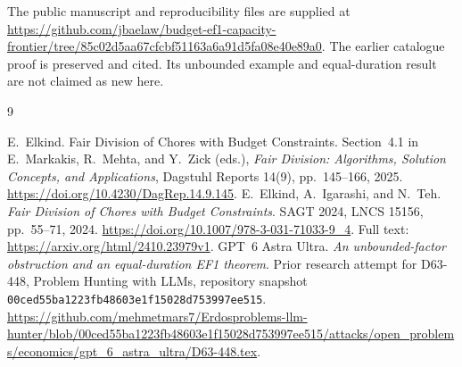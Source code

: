\documentclass[11pt]{article}
\begin{document}
The public manuscript and reproducibility files are supplied at
\url{https://github.com/jbaelaw/budget-ef1-capacity-frontier/tree/85c02d5aa67cfcbf51163a6a91d5fa08e40e89a0}.
The earlier catalogue proof is preserved and cited. Its unbounded example
and equal-duration result are not claimed as new here.

\begin{thebibliography}{9}
\raggedright
{}
E.~Elkind. Fair Division of Chores with Budget Constraints.
Section~4.1 in E.~Markakis, R.~Mehta, and Y.~Zick (eds.),
\emph{Fair Division: Algorithms, Solution Concepts, and Applications},
Dagstuhl Reports 14(9), pp.~145--166, 2025.
\url{https://doi.org/10.4230/DagRep.14.9.145}.
E.~Elkind, A.~Igarashi, and N.~Teh.
\emph{Fair Division of Chores with Budget Constraints}.
SAGT 2024, LNCS 15156, pp.~55--71, 2024.
\url{https://doi.org/10.1007/978-3-031-71033-9_4}.
Full text: \url{https://arxiv.org/html/2410.23979v1}.
GPT~6 Astra Ultra. \emph{An unbounded-factor obstruction and an
equal-duration EF1 theorem}. Prior research attempt for D63-448,
Problem Hunting with LLMs, repository snapshot
\texttt{00ced55ba1223fb48603e1f15028d753997ee515}.
\url{https://github.com/mehmetmars7/Erdosproblems-llm-hunter/blob/00ced55ba1223fb48603e1f15028d753997ee515/attacks/open_problems/economics/gpt_6_astra_ultra/D63-448.tex}.
\end{thebibliography}
\end{document}
